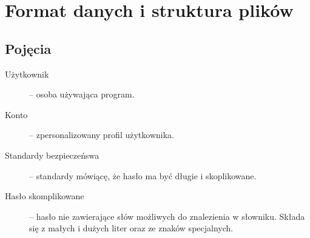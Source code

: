 \documentclass[a4paper]{article}
\begin{document}
\section{Format danych i struktura plików}

\subsection{Pojęcia}
\begin{description}
    \item[Użytkownik]-- osoba używająca program.
    \item[Konto]-- zpersonalizowany profil użytkownika.
    \item[Standardy bezpieczeńswa]-- standardy mówiącę, że hasło ma być długie i skoplikowane.
    \item[Hasło skomplikowane]-- hasło nie zawierające słów możliwych do znalezienia w słowniku. Składa się z małych i dużych liter oraz ze znaków specjalnych.
\end{description}
\end{document}
